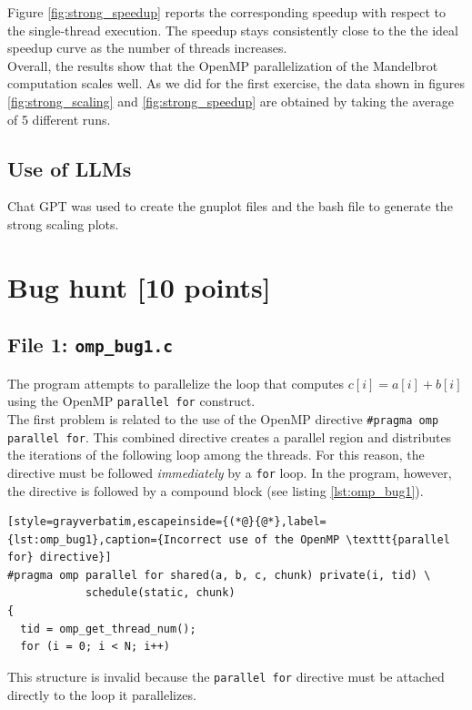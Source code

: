 \documentclass[unicode,10pt,a4paper,oneside,numbers=endperiod,openany]{scrartcl}
\begin{document}
Figure \ref{fig:strong_speedup} reports the corresponding speedup with respect to the single-thread execution. The speedup stays consistently close to the the ideal speedup curve as the number of threads increases.\\

Overall, the results show that the OpenMP parallelization of the Mandelbrot computation scales well.
As we did for the first exercise, the data shown in figures \ref{fig:strong_scaling} and \ref{fig:strong_speedup} are obtained by taking the average of 5 different runs. 

\subsection{Use of LLMs}
Chat GPT was used to create the gnuplot files and the bash file to generate the strong scaling plots.
\newpage

\section{Bug hunt [10 points]}
\subsection{File 1:   \texttt{omp\_bug1.c}}

The program attempts to parallelize the loop that computes $c[i] = a[i] + b[i] $
using the OpenMP \texttt{parallel for} construct.\\
The first problem is related to the use of the OpenMP directive
\texttt{\#pragma omp parallel for}. This combined directive creates a parallel
region and distributes the iterations of the following loop among the threads.
For this reason, the directive must be followed \emph{immediately} by a
\texttt{for} loop. In the program, however, the directive is followed by a
compound block (see listing \ref{lst:omp_bug1}).

\begin{lstlisting}[style=grayverbatim,escapeinside={(*@}{@*},label={lst:omp_bug1},caption={Incorrect use of the OpenMP \texttt{parallel for} directive}]
#pragma omp parallel for shared(a, b, c, chunk) private(i, tid) \
            schedule(static, chunk)
{
  tid = omp_get_thread_num();
  for (i = 0; i < N; i++)
\end{lstlisting}

This structure is invalid because the \texttt{parallel for} directive must be
attached directly to the loop it parallelizes.
\end{document}
